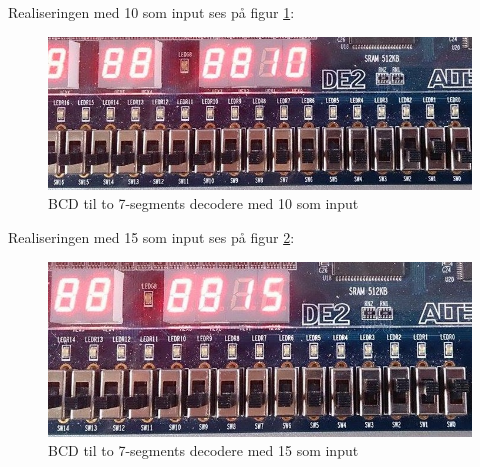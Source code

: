 \begin{enumerate}
Realiseringen med 10 som input ses på figur \ref{fig:2Seg10}:
	\begin{figure}[h]
		\centering
		\includegraphics[scale=0.6]{pictures/Oevelse4/BCD_decoder/BCD_2seg_10.jpg}
		\caption{BCD til to 7-segments decodere med 10 som input}
		\label{fig:2Seg10}
	\end{figure}
	
Realiseringen med 15 som input ses på figur \ref{fig:2Seg15}:
	\begin{figure}[h]
		\centering
		\includegraphics[scale=0.6]{pictures/Oevelse4/BCD_decoder/BCD_2seg_15.jpg}
		\caption{BCD til to 7-segments decodere med 15 som input}
		\label{fig:2Seg15}
	\end{figure}
\pagebreak

\end{enumerate}